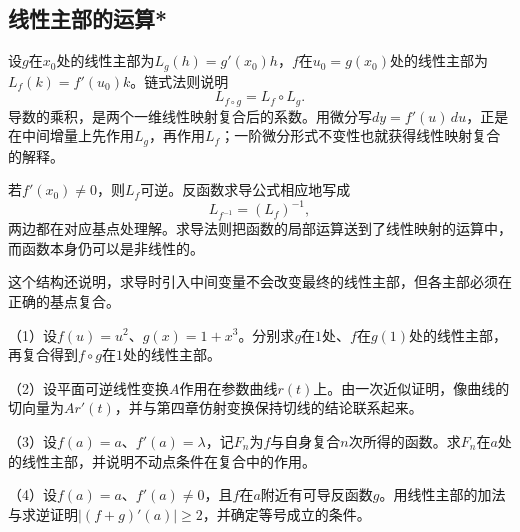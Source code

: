 \FloatBarrier
\newpage
\subsection{线性主部的运算*}

设\(g\)在\(x_0\)处的线性主部为\(L_g(h)=g'(x_0)h\)，\(f\)在\(u_0=g(x_0)\)处的线性主部为\(L_f(k)=f'(u_0)k\)。链式法则说明
\begin{equation*}
 L_{f\circ g}=L_f\circ L_g.
\end{equation*}
导数的乘积，是两个一维线性映射复合后的系数。用微分写\(dy=f'(u)\,du\)，正是在中间增量上先作用\(L_g\)，再作用\(L_f\)；一阶微分形式不变性也就获得线性映射复合的解释。

若\(f'(x_0)\ne0\)，则\(L_f\)可逆。反函数求导公式相应地写成
\begin{equation*}
 L_{f^{-1}}=(L_f)^{-1},
\end{equation*}
两边都在对应基点处理解。求导法则把函数的局部运算送到了线性映射的运算中，而函数本身仍可以是非线性的。

这个结构还说明，求导时引入中间变量不会改变最终的线性主部，但各主部必须在正确的基点复合。

\begin{exercise}
\mbox{}\par\nobreak

（1）设\(f(u)=u^2\)、\(g(x)=1+x^3\)。分别求\(g\)在\(1\)处、\(f\)在\(g(1)\)处的线性主部，再复合得到\(f\circ g\)在\(1\)处的线性主部。

（2）设平面可逆线性变换\(A\)作用在参数曲线\(r(t)\)上。由一次近似证明，像曲线的切向量为\(Ar'(t)\)，并与第四章仿射变换保持切线的结论联系起来。

（3）设\(f(a)=a\)、\(f'(a)=\lambda\)，记\(F_n\)为\(f\)与自身复合\(n\)次所得的函数。求\(F_n\)在\(a\)处的线性主部，并说明不动点条件在复合中的作用。

（4）设\(f(a)=a\)、\(f'(a)\ne0\)，且\(f\)在\(a\)附近有可导反函数\(g\)。用线性主部的加法与求逆证明\(|(f+g)'(a)|\ge2\)，并确定等号成立的条件。
\end{exercise}
